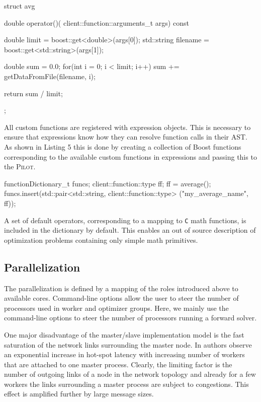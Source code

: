 \documentclass[%
preprint,
preprint,
linenumbers,
amsmath,amssymb,
aps,
prstab,
]{revtex4-1}
\begin{document}
\begin{code}
struct avg {

    double operator()(
      client::function::arguments_t args) const {

        double limit = boost::get<double>(args[0]);
        std::string filename =
          boost::get<std::string>(args[1]);

        double sum = 0.0;
        for(int i = 0; i < limit; i++)
            sum += getDataFromFile(filename, i);

        return sum / limit;
    }
};
\end{code}

All custom functions are registered with expression objects.
This is necessary to ensure that expressions know how they can resolve
  function calls in their AST.
As shown in Listing 5 this is done by creating a collection of Boost
  functions~\cite{boost3} corresponding to the
  available custom functions in expressions and passing this to the
  \textsc{Pilot}.

\begin{code}
functionDictionary_t funcs;
client::function::type ff;
ff = average();
funcs.insert(std::pair<std::string, 
		client::function::type> 
       		("my_average_name", ff));
\end{code}

A set of default operators, corresponding to a mapping to \texttt{C} math
  functions, is included in the dictionary by default.
This enables an out of source description of optimization problems containing
  only simple math primitives.


\subsection{Parallelization} \label{sec:parallelization}

The parallelization is defined by a mapping of the roles introduced above to
  available cores.
Command-line options allow the user to steer the number of processors used in
  worker and optimizer groups.
Here, we mainly use the command-line options to steer the number of processors
  running a forward solver.

One major disadvantage of the master/slave implementation model is the fast
  saturation of the network links surrounding the master node.
In \cite{bctg:09} authors observe an exponential increase in hot-spot latency
  with increasing number of workers that are attached to one master process.
Clearly, the limiting factor is the number of outgoing links of a node in the
  network topology and already for a few workers the links surrounding a
  master process are subject to congestions.
This effect is amplified further by large message sizes.
\end{document}
